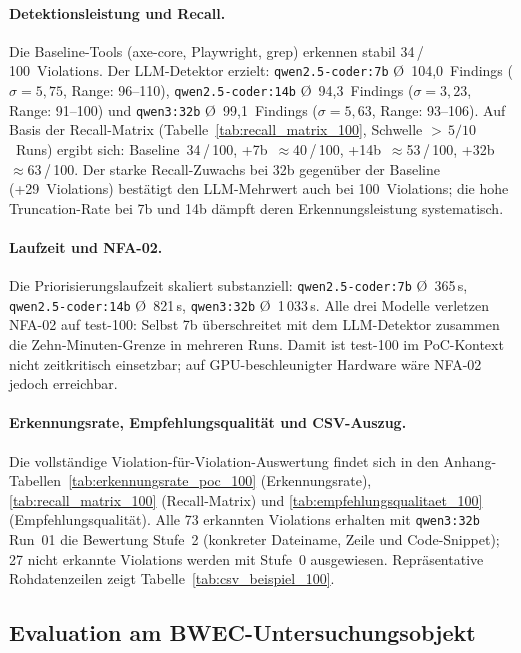\paragraph{Detektionsleistung und Recall.}
Die Baseline-Tools (axe-core, Playwright, grep) erkennen stabil 34\,/\,100~Violations. Der \ac{LLM}-Detektor erzielt: \texttt{qwen2.5-coder:7b} \O{}~104{,}0~Findings ($\sigma = 5{,}75$, Range: 96--110), \texttt{qwen2.5-coder:14b} \O{}~94{,}3~Findings ($\sigma = 3{,}23$, Range: 91--100) und \texttt{qwen3:32b} \O{}~99{,}1~Findings ($\sigma = 5{,}63$, Range: 93--106). Auf Basis der Recall-Matrix (Tabelle~\ref{tab:recall_matrix_100}, Schwelle $>\,5/10$~Runs) ergibt sich: Baseline~34\,/\,100, +7b~$\approx$40\,/\,100, +14b~$\approx$53\,/\,100, +32b~$\approx$63\,/\,100. Der starke Recall-Zuwachs bei 32b gegenüber der Baseline (+29~Violations) bestätigt den LLM-Mehrwert auch bei 100~Violations; die hohe Truncation-Rate bei 7b und 14b dämpft deren Erkennungsleistung systematisch.

\paragraph{Laufzeit und NFA-02.}
Die Priorisierungslaufzeit skaliert substanziell: \texttt{qwen2.5-coder:7b} \O{}~365\,s, \texttt{qwen2.5-coder:14b} \O{}~821\,s, \texttt{qwen3:32b} \O{}~1\,033\,s. Alle drei Modelle verletzen \ac{NFA}-02 auf test-100: Selbst 7b überschreitet mit dem \ac{LLM}-Detektor zusammen die Zehn-Minuten-Grenze in mehreren Runs. Damit ist test-100 im \ac{PoC}-Kontext nicht zeitkritisch einsetzbar; auf \ac{GPU}-beschleunigter Hardware wäre \ac{NFA}-02 jedoch erreichbar.

\paragraph{Erkennungsrate, Empfehlungsqualität und CSV-Auszug.}
Die vollständige Violation-für-Violation-Auswertung findet sich in den Anhang-Tabellen~\ref{tab:erkennungsrate_poc_100} (Erkennungsrate), \ref{tab:recall_matrix_100} (Recall-Matrix) und \ref{tab:empfehlungsqualitaet_100} (Empfehlungsqualität). Alle 73 erkannten Violations erhalten mit \texttt{qwen3:32b} Run~01 die Bewertung Stufe~2 (konkreter Dateiname, Zeile und Code-Snippet); 27 nicht erkannte Violations werden mit Stufe~0 ausgewiesen. Repräsentative Rohdatenzeilen zeigt Tabelle~\ref{tab:csv_beispiel_100}.

\subsection{Evaluation am \ac{BWEC}-Untersuchungsobjekt}
\label{sec:eval_bwec}

